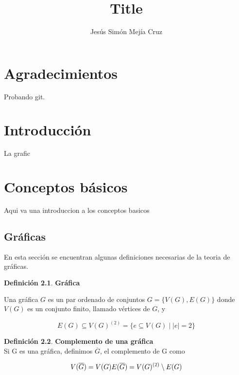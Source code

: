 \documentclass[11pt]{book}
\theoremstyle{definition}
\newtheorem{definition}{Definición}
\newcounter{in}
\newcounter{ini}
\begin{document}
\title{Title}
\author{Jesús Simón Mejía Cruz}
\date{}
\maketitle


\newpage
\thispagestyle{empty}
 \chapter*{Agradecimientos}

Probando git.



\newpage
 \thispagestyle{empty}





 \chapter{Introducción}

La grafic




\tableofcontents




\chapter{Conceptos básicos}

Aqui va una introduccion a los conceptos basicos


\section{Gráficas}

En esta sección se encuentran algunas definiciones necesarias de la teoria de gráficas.


\begin{definition}\textbf{Gráfica}

Una gráfica $G$ es un par ordenado de conjuntos
$G=\{V(G),E(G)\}$ donde $V(G)$ es un conjunto
finito, llamado vértices de $G$, y

\begin{equation*}
 E(G) \subseteq
V(G)^{(2)}=\{e\subseteq V(G) \mid |e|=2\}
\end{equation*}
\end{definition}


\begin{definition}\textbf{Complemento de una gráfica}\\
Si G es una gráfica, definimos $\overline{G}$, el complemento de G
como

\begin{equation*}
V(\overline{G})=V(G)\\
E(\overline{G})=V(G)^{(2)}\setminus E(G)
\end{equation*}
\end{definition}
\end{document}
